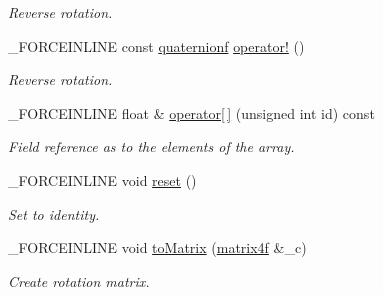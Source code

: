 \begin{DoxyCompactItemize}
\begin{DoxyCompactList}\small\item\em Reverse rotation. \end{DoxyCompactList}\item 
\hypertarget{classbt_1_1quaternionf_a02fdfce4c7d1f12ea7dc522195339fe1}{\-\_\-\-F\-O\-R\-C\-E\-I\-N\-L\-I\-N\-E const \hyperlink{classbt_1_1quaternionf}{quaternionf} \hyperlink{classbt_1_1quaternionf_a02fdfce4c7d1f12ea7dc522195339fe1}{operator!} ()}\label{classbt_1_1quaternionf_a02fdfce4c7d1f12ea7dc522195339fe1}

\begin{DoxyCompactList}\small\item\em Reverse rotation. \end{DoxyCompactList}\item 
\hypertarget{classbt_1_1quaternionf_a239a9bf80645961ab6dfa033528069e9}{\-\_\-\-F\-O\-R\-C\-E\-I\-N\-L\-I\-N\-E float \& \hyperlink{classbt_1_1quaternionf_a239a9bf80645961ab6dfa033528069e9}{operator\mbox{[}$\,$\mbox{]}} (unsigned int id) const }\label{classbt_1_1quaternionf_a239a9bf80645961ab6dfa033528069e9}

\begin{DoxyCompactList}\small\item\em Field reference as to the elements of the array. \end{DoxyCompactList}\item 
\hypertarget{classbt_1_1quaternionf_a45b307d1c11469acb51e4be54a0e2051}{\-\_\-\-F\-O\-R\-C\-E\-I\-N\-L\-I\-N\-E void \hyperlink{classbt_1_1quaternionf_a45b307d1c11469acb51e4be54a0e2051}{reset} ()}\label{classbt_1_1quaternionf_a45b307d1c11469acb51e4be54a0e2051}

\begin{DoxyCompactList}\small\item\em Set to identity. \end{DoxyCompactList}\item 
\hypertarget{classbt_1_1quaternionf_a63049cebd5b1daf7616bd0651638b0c4}{\-\_\-\-F\-O\-R\-C\-E\-I\-N\-L\-I\-N\-E void \hyperlink{classbt_1_1quaternionf_a63049cebd5b1daf7616bd0651638b0c4}{to\-Matrix} (\hyperlink{classbt_1_1matrix4f}{matrix4f} \&\-\_\-c)}\label{classbt_1_1quaternionf_a63049cebd5b1daf7616bd0651638b0c4}

\begin{DoxyCompactList}\small\item\em Create rotation matrix. \end{DoxyCompactList}\end{DoxyCompactItemize}
